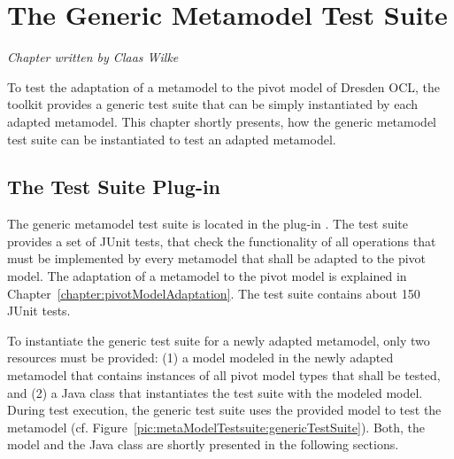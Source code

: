 \chapter{The Generic Metamodel Test Suite}
\label{chapter:metaModelTestSuite}

\begin{flushright}
\textit{Chapter written by Claas Wilke}
\end{flushright}

To test the adaptation of a metamodel to the pivot model of Dresden OCL, the
toolkit provides a generic test suite that can be simply instantiated by each 
adapted metamodel. This chapter shortly presents, how the generic metamodel 
test suite can be instantiated to test an adapted metamodel.



\section{The Test Suite Plug-in}

The generic metamodel test suite is located in the plug-in 
. The test suite 
provides a set of JUnit tests, that check the functionality of all operations 
that must be implemented by every metamodel that shall be adapted to the pivot 
model. The adaptation of a metamodel to the pivot model is explained in 
Chapter~\ref{chapter:pivotModelAdaptation}. The test suite contains about 150
JUnit tests.

To instantiate the generic test suite for a newly adapted metamodel, only two
resources must be provided: (1) a model modeled in the newly adapted metamodel 
that contains instances of all pivot model types that shall be tested, and (2) a
Java class that instantiates the test suite with the modeled model. During test 
execution, the generic test suite uses the provided model to test the metamodel
(cf. Figure~\ref{pic:metaModelTestsuite:genericTestSuite}). Both, the model and 
the Java class are shortly presented in the following sections.

